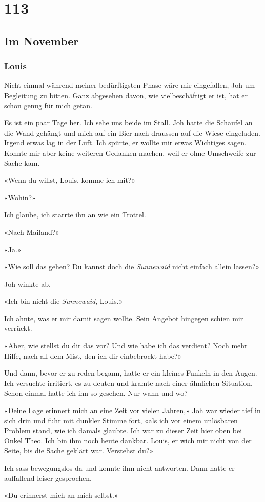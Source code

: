 \chapter{113}

\section{Im
November}

\subsection{Louis}

Nicht einmal während meiner bedürftigsten Phase wäre mir eingefallen,
Joh um Begleitung zu bitten. Ganz abgesehen davon, wie vielbeschäftigt
er ist, hat er schon genug für mich getan.

Es ist ein paar Tage her. Ich sehe uns beide im Stall.
Joh hatte die Schaufel an die Wand gehängt und mich auf ein Bier nach
draussen auf die Wiese eingeladen. Irgend etwas lag in der Luft. Ich
spürte, er wollte mir etwas Wichtiges sagen. Konnte mir aber keine
weiteren Gedanken machen, weil er ohne Umschweife zur Sache kam.

«Wenn du willst, Louis, komme ich mit?»

«Wohin?»

Ich glaube, ich starrte ihn an wie ein Trottel.

«Nach Mailand?»

«Ja.»

«Wie soll das gehen? Du kannst doch die \emph{Sunnewaid} nicht einfach
allein lassen?»

Joh winkte ab.

«Ich bin nicht die \emph{Sunnewaid}, Louis.»

Ich ahnte, was er mir damit sagen wollte. Sein Angebot hingegen schien
mir verrückt.

«Aber, wie stellst du dir das vor? Und wie habe ich das verdient? Noch
mehr Hilfe, nach all dem Mist, den ich dir einbebrockt habe?»

Und dann, bevor er zu reden begann, hatte er ein kleines Funkeln in den
Augen. Ich versuchte irritiert, es zu deuten und kramte nach einer
ähnlichen Situation. Schon einmal hatte ich ihn so gesehen. Nur wann und
wo?

«Deine Lage erinnert mich an eine Zeit vor vielen Jahren,» Joh war
wieder tief in sich drin und fuhr mit dunkler Stimme fort, «als ich vor
einem unlösbaren Problem stand, wie ich damals glaubte. Ich war zu
dieser Zeit hier oben bei Onkel Theo. Ich bin ihm noch heute dankbar.
Louis, er wich mir nicht von der Seite, bis die Sache geklärt war.
Verstehst du?»

Ich sass bewegungslos da und konnte ihm nicht antworten.
Dann hatte er auffallend leiser gesprochen.

«Du erinnerst mich an mich selbst.»

